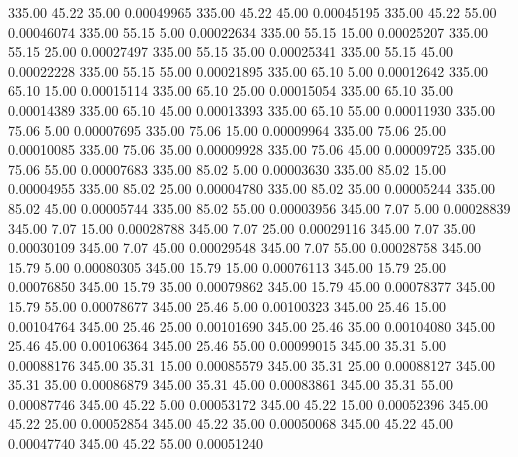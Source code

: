    335.00     45.22     35.00     0.00049965
    335.00     45.22     45.00     0.00045195
    335.00     45.22     55.00     0.00046074
    335.00     55.15      5.00     0.00022634
    335.00     55.15     15.00     0.00025207
    335.00     55.15     25.00     0.00027497
    335.00     55.15     35.00     0.00025341
    335.00     55.15     45.00     0.00022228
    335.00     55.15     55.00     0.00021895
    335.00     65.10      5.00     0.00012642
    335.00     65.10     15.00     0.00015114
    335.00     65.10     25.00     0.00015054
    335.00     65.10     35.00     0.00014389
    335.00     65.10     45.00     0.00013393
    335.00     65.10     55.00     0.00011930
    335.00     75.06      5.00     0.00007695
    335.00     75.06     15.00     0.00009964
    335.00     75.06     25.00     0.00010085
    335.00     75.06     35.00     0.00009928
    335.00     75.06     45.00     0.00009725
    335.00     75.06     55.00     0.00007683
    335.00     85.02      5.00     0.00003630
    335.00     85.02     15.00     0.00004955
    335.00     85.02     25.00     0.00004780
    335.00     85.02     35.00     0.00005244
    335.00     85.02     45.00     0.00005744
    335.00     85.02     55.00     0.00003956
    345.00      7.07      5.00     0.00028839
    345.00      7.07     15.00     0.00028788
    345.00      7.07     25.00     0.00029116
    345.00      7.07     35.00     0.00030109
    345.00      7.07     45.00     0.00029548
    345.00      7.07     55.00     0.00028758
    345.00     15.79      5.00     0.00080305
    345.00     15.79     15.00     0.00076113
    345.00     15.79     25.00     0.00076850
    345.00     15.79     35.00     0.00079862
    345.00     15.79     45.00     0.00078377
    345.00     15.79     55.00     0.00078677
    345.00     25.46      5.00     0.00100323
    345.00     25.46     15.00     0.00104764
    345.00     25.46     25.00     0.00101690
    345.00     25.46     35.00     0.00104080
    345.00     25.46     45.00     0.00106364
    345.00     25.46     55.00     0.00099015
    345.00     35.31      5.00     0.00088176
    345.00     35.31     15.00     0.00085579
    345.00     35.31     25.00     0.00088127
    345.00     35.31     35.00     0.00086879
    345.00     35.31     45.00     0.00083861
    345.00     35.31     55.00     0.00087746
    345.00     45.22      5.00     0.00053172
    345.00     45.22     15.00     0.00052396
    345.00     45.22     25.00     0.00052854
    345.00     45.22     35.00     0.00050068
    345.00     45.22     45.00     0.00047740
    345.00     45.22     55.00     0.00051240
